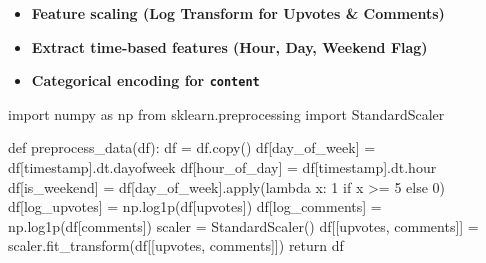 \documentclass[
  letterpaper,
  DIV=11,
  numbers=noendperiod]{scrartcl}
\newenvironment{Shaded}{\begin{snugshade}}{\end{snugshade}}
\newcommand{\BuiltInTok}[1]{\textcolor[rgb]{0.00,0.23,0.31}{#1}}
\newcommand{\ControlFlowTok}[1]{\textcolor[rgb]{0.00,0.23,0.31}{#1}}
\newcommand{\DecValTok}[1]{\textcolor[rgb]{0.68,0.00,0.00}{#1}}
\newcommand{\ImportTok}[1]{\textcolor[rgb]{0.00,0.46,0.62}{#1}}
\newcommand{\KeywordTok}[1]{\textcolor[rgb]{0.00,0.23,0.31}{#1}}
\newcommand{\NormalTok}[1]{\textcolor[rgb]{0.00,0.23,0.31}{#1}}
\newcommand{\OperatorTok}[1]{\textcolor[rgb]{0.37,0.37,0.37}{#1}}
\newcommand{\StringTok}[1]{\textcolor[rgb]{0.13,0.47,0.30}{#1}}
\providecommand{\tightlist}{%
  \setlength{\itemsep}{0pt}\setlength{\parskip}{0pt}}\usepackage{longtable,booktabs,array}
\begin{document}
\begin{itemize}
\tightlist
\item
  \textbf{Feature scaling (Log Transform for Upvotes \& Comments)}
\item
  \textbf{Extract time-based features (Hour, Day, Weekend Flag)}
\item
  \textbf{Categorical encoding for \texttt{content}}
\end{itemize}

\begin{Shaded}
\begin{Highlighting}[]
\ImportTok{import}\NormalTok{ numpy }\ImportTok{as}\NormalTok{ np}
\ImportTok{from}\NormalTok{ sklearn.preprocessing }\ImportTok{import}\NormalTok{ StandardScaler}

\KeywordTok{def}\NormalTok{ preprocess\_data(df):}
\NormalTok{    df }\OperatorTok{=}\NormalTok{ df.copy()}
\NormalTok{    df[}\StringTok{\textquotesingle{}day\_of\_week\textquotesingle{}}\NormalTok{] }\OperatorTok{=}\NormalTok{ df[}\StringTok{\textquotesingle{}timestamp\textquotesingle{}}\NormalTok{].dt.dayofweek}
\NormalTok{    df[}\StringTok{\textquotesingle{}hour\_of\_day\textquotesingle{}}\NormalTok{] }\OperatorTok{=}\NormalTok{ df[}\StringTok{\textquotesingle{}timestamp\textquotesingle{}}\NormalTok{].dt.hour}
\NormalTok{    df[}\StringTok{\textquotesingle{}is\_weekend\textquotesingle{}}\NormalTok{] }\OperatorTok{=}\NormalTok{ df[}\StringTok{\textquotesingle{}day\_of\_week\textquotesingle{}}\NormalTok{].}\BuiltInTok{apply}\NormalTok{(}\KeywordTok{lambda}\NormalTok{ x: }\DecValTok{1} \ControlFlowTok{if}\NormalTok{ x }\OperatorTok{\textgreater{}=} \DecValTok{5} \ControlFlowTok{else} \DecValTok{0}\NormalTok{)}
\NormalTok{    df[}\StringTok{\textquotesingle{}log\_upvotes\textquotesingle{}}\NormalTok{] }\OperatorTok{=}\NormalTok{ np.log1p(df[}\StringTok{\textquotesingle{}upvotes\textquotesingle{}}\NormalTok{])}
\NormalTok{    df[}\StringTok{\textquotesingle{}log\_comments\textquotesingle{}}\NormalTok{] }\OperatorTok{=}\NormalTok{ np.log1p(df[}\StringTok{\textquotesingle{}comments\textquotesingle{}}\NormalTok{])}
\NormalTok{    scaler }\OperatorTok{=}\NormalTok{ StandardScaler()}
\NormalTok{    df[[}\StringTok{\textquotesingle{}upvotes\textquotesingle{}}\NormalTok{, }\StringTok{\textquotesingle{}comments\textquotesingle{}}\NormalTok{]] }\OperatorTok{=}\NormalTok{ scaler.fit\_transform(df[[}\StringTok{\textquotesingle{}upvotes\textquotesingle{}}\NormalTok{, }\StringTok{\textquotesingle{}comments\textquotesingle{}}\NormalTok{]])}
    \ControlFlowTok{return}\NormalTok{ df}
\end{Highlighting}
\end{Shaded}
\end{document}
